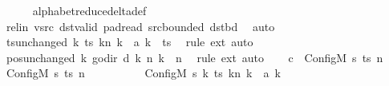 \begin{isabellebody}
\ \ \ \ \isamarkupfalse%
\ alphabet{\isacharunderscore}{\kern0pt}reduce{\isacharunderscore}{\kern0pt}delta{\isacharunderscore}{\kern0pt}def\isanewline
\ \ \ \ \isamarkupfalse%
\ rel{\isacharunderscore}{\kern0pt}in\ vsrc\ dst{\isacharunderscore}{\kern0pt}valid\ pad{\isacharunderscore}{\kern0pt}read\ src{\isacharunderscore}{\kern0pt}bounded\ dst{\isacharunderscore}{\kern0pt}bd\ \isamarkupfalse%
\ auto\isanewline
\ \ \isamarkupfalse%
\ ts{\isacharunderscore}{\kern0pt}unchanged{\isacharcolon}{\kern0pt}\ {\isachardoublequoteopen}{\isacharparenleft}{\kern0pt}{\isasymlambda}k{\isachardot}{\kern0pt}\ {\isacharparenleft}{\kern0pt}ts\ k{\isacharparenright}{\kern0pt}{\isacharparenleft}{\kern0pt}n\ k\ {\isacharcolon}{\kern0pt}{\isacharequal}{\kern0pt}\ {\isacharquery}{\kern0pt}a\ k{\isacharparenright}{\kern0pt}{\isacharparenright}{\kern0pt}\ {\isacharequal}{\kern0pt}\ ts{\isachardoublequoteclose}\ \isamarkupfalse%
\ {\isacharparenleft}{\kern0pt}rule\ ext{\isacharparenright}{\kern0pt}\ auto\isanewline
\ \ \isamarkupfalse%
\ pos{\isacharunderscore}{\kern0pt}unchanged{\isacharcolon}{\kern0pt}\ {\isachardoublequoteopen}{\isacharparenleft}{\kern0pt}{\isasymlambda}k{\isachardot}{\kern0pt}\ go{\isacharunderscore}{\kern0pt}dir\ {\isacharparenleft}{\kern0pt}{\isacharquery}{\kern0pt}d\ k{\isacharparenright}{\kern0pt}\ {\isacharparenleft}{\kern0pt}n\ k{\isacharparenright}{\kern0pt}{\isacharparenright}{\kern0pt}\ {\isacharequal}{\kern0pt}\ n{\isachardoublequoteclose}\ \isamarkupfalse%
\ {\isacharparenleft}{\kern0pt}rule\ ext{\isacharparenright}{\kern0pt}\ auto\isanewline
\ \ \isamarkupfalse%
\ {\isacharquery}{\kern0pt}c{\isacharprime}{\kern0pt}{\isacharprime}{\kern0pt}\ {\isacharequal}{\kern0pt}\ {\isachardoublequoteopen}Config\isactrlsub M\ {\isacharquery}{\kern0pt}s{\isacharprime}{\kern0pt}\ ts\ n{\isachardoublequoteclose}\isanewline
\ \ \isamarkupfalse%
\ {\isachardoublequoteopen}{\isacharparenleft}{\kern0pt}Config\isactrlsub M\ {\isacharquery}{\kern0pt}s\ ts\ n{\isacharcomma}{\kern0pt}\isanewline
\ \ \ \ \ \ \ \ \ \ Config\isactrlsub M\ {\isacharquery}{\kern0pt}s{\isacharprime}{\kern0pt}\ {\isacharparenleft}{\kern0pt}{\isasymlambda}k{\isachardot}{\kern0pt}\ {\isacharparenleft}{\kern0pt}ts\ k{\isacharparenright}{\kern0pt}{\isacharparenleft}{\kern0pt}n\ k\ {\isacharcolon}{\kern0pt}{\isacharequal}{\kern0pt}\ {\isacharquery}{\kern0pt}a\ k{\isacharparenright}{\kern0pt}{\isacharparenright}{\kern0pt}\isanewline

\end{isabellebody}
